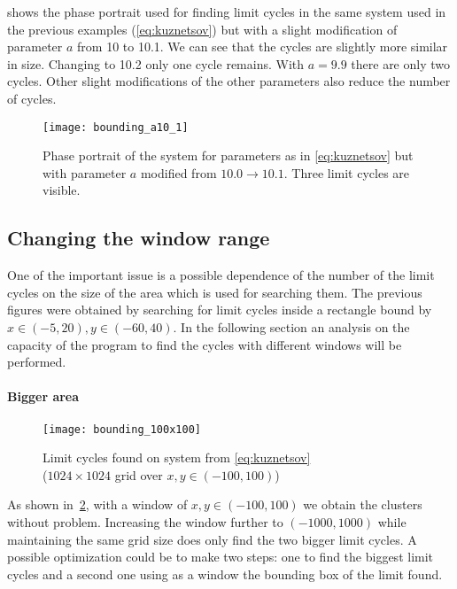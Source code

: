  shows the phase portrait used for finding limit cycles in the same system used in the previous examples (\cref{eq:kuznetsov}) but with a slight modification of parameter $a$ from 10 to 10.1. We can see that the cycles are slightly more similar in size. Changing to 10.2 only one cycle remains. With $a = 9.9$ there are only two cycles. Other slight modifications of the other parameters also reduce the number of cycles.

\begin{figure}[H]
    \centering
    \texttt{[image: bounding\_a10\_1]}
    \caption{Phase portrait of the system for parameters as in \cref{eq:kuznetsov} but with parameter $a$ modified from $10.0 \to 10.1$. Three limit cycles are visible.
    }
    \label{fig:bounding_a10_1}
\end{figure}

\pagebreak
\subsection{Changing the window range}%
\label{sub:window_range}

One of the important issue is a possible dependence of the number of the limit cycles on the size of the area which is used for searching them. The previous figures were obtained by searching for limit cycles inside a rectangle bound by $x \in (-5, 20), y \in (-60, 40)$. In the following section an analysis on the capacity of the program to find the cycles with different windows will be performed.

\paragraph{Bigger area}

\begin{figure}[H]
    \centering
    \texttt{[image: bounding\_100x100]}
    \caption{Limit cycles found on system from \cref{eq:kuznetsov} \\
        ($1024 \times 1024$ grid over $x, y \in (-100, 100)$)
    }%
    \label{fig:bounding_100x100}
\end{figure}

As shown in~\cref{fig:bounding_100x100}, with a window of $x,y \in (-100,100)$ we obtain the clusters without problem. Increasing the window further to $(-1000, 1000)$ while maintaining the same
grid size does only find the two bigger limit cycles.
A possible optimization could be to make two steps: one to find the biggest limit cycles and a second one using as a window the bounding box of the limit found.


